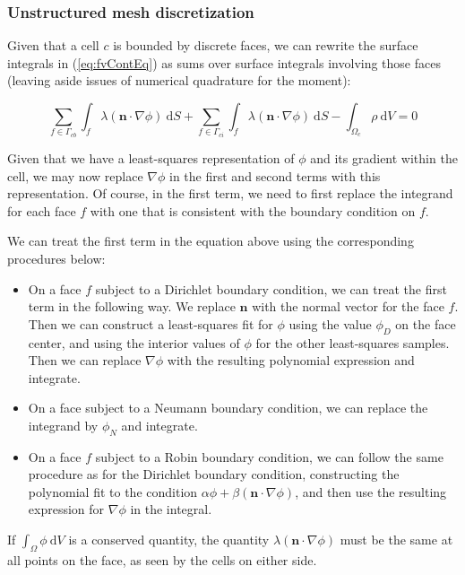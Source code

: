 \documentclass[12pt]{article}
\newcommand{\refEq}[1]{(\ref{eq:#1})}
\renewcommand{\vec}[1]{\mathbf{#1}}
\newcommand{\grad}[1]{\nabla#1}
\newcommand{\dV}{~\mathrm{d}V}
\newcommand{\dS}{~\mathrm{d}S}
\begin{document}
\subsubsection*{Unstructured mesh discretization}

Given that a cell $c$ is bounded by discrete faces, we can rewrite the surface integrals in \refEq{fvContEq} as sums over 
surface integrals involving those faces (leaving aside issues of numerical quadrature for the moment):

\begin{equation}
\sum_{f \in \Gamma_{cb}}\int_f \lambda (\vec{n}\cdot\grad{\phi}) \dS + 
\sum_{f \in \Gamma_{ci}}\int_f \lambda (\vec{n}\cdot\grad{\phi}) \dS - \int_{\Omega_c} \rho \dV = 0 
\end{equation}

\noindent
Given that we have a least-squares representation of $\phi$ and its gradient within the cell, we may now replace $\grad{\phi}$ 
in the first and second terms with this representation. Of course, in the first term, we need to first replace the 
integrand for each face $f$ with one that is consistent with the boundary condition on $f$.

We can treat the first term in the equation above using the corresponding procedures below:

\begin{itemize}
 \item On a face $f$ subject to a Dirichlet boundary condition, we can treat the first term in the following way. We replace $\vec{n}$ 
  with the normal vector for the face $f$. Then we can construct a least-squares fit for $\phi$ using the value $\phi_D$ on the face 
  center, and using the interior values of $\phi$ for the other least-squares samples. Then we can replace $\grad{\phi}$ with the 
  resulting polynomial expression and integrate.
 \item On a face subject to a Neumann boundary condition, we can replace the integrand by $\phi_N$ and integrate.
 \item On a face $f$ subject to a Robin boundary condition, we can follow the same procedure as for the Dirichlet boundary condition, 
  constructing the polynomial fit to the condition $\alpha\phi + \beta(\vec{n}\cdot\grad{\phi})$, and then use the resulting 
  expression for $\grad{\phi}$ in the integral.
\end{itemize}

If $\int_\Omega \phi \dV$ is a conserved quantity, the quantity $\lambda(\vec{n}\cdot\grad{\phi})$ must be the same at all points
on the face, as seen by the cells on either side.
\end{document}
